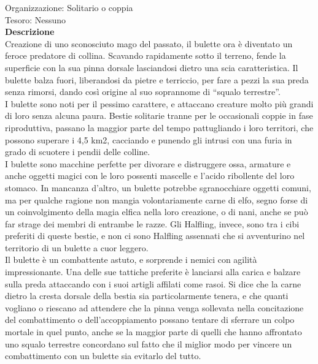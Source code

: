 \begin{multicols}{2}
Organizzazione: Solitario o coppia\\
Tesoro: Nessuno\\
\textbf{Descrizione}\\
Creazione di uno sconosciuto mago del passato, il bulette ora è diventato un feroce predatore di collina. Scavando rapidamente sotto il terreno, fende la superficie con la sua pinna dorsale lasciandosi dietro una scia caratteristica. Il bulette balza fuori, liberandosi da pietre e terriccio, per fare a pezzi la sua preda senza rimorsi, dando così origine al suo soprannome di “squalo terrestre”.\\
I bulette sono noti per il pessimo carattere, e attaccano creature molto più grandi di loro senza alcuna paura. Bestie solitarie tranne per le occasionali coppie in fase riproduttiva, passano la maggior parte del tempo pattugliando i loro territori, che possono superare i 4,5 km2, cacciando e punendo gli intrusi con una furia in grado di scuotere i pendii delle colline.\\
I bulette sono macchine perfette per divorare e distruggere ossa, armature e anche oggetti magici con le loro possenti mascelle e l'acido ribollente del loro stomaco. In mancanza d'altro, un bulette potrebbe sgranocchiare oggetti comuni, ma per qualche ragione non mangia volontariamente carne di elfo, segno forse di un coinvolgimento della magia elfica nella loro creazione, o di nani, anche se può far strage dei membri di entrambe le razze. Gli Halfling, invece, sono tra i cibi preferiti di queste bestie, e non ci sono Halfling assennati che si avventurino nel territorio di un bulette a cuor leggero.\\
Il bulette è un combattente astuto, e sorprende i nemici con agilità impressionante. Una delle sue tattiche preferite è lanciarsi alla carica e balzare sulla preda attaccando con i suoi artigli affilati come rasoi. Si dice che la carne dietro la cresta dorsale della bestia sia particolarmente tenera, e che quanti vogliano o riescano ad attendere che la pinna venga sollevata nella concitazione del combattimento o dell'accoppiamento possano tentare di sferrare un colpo mortale in quel punto, anche se la maggior parte di quelli che hanno affrontato uno squalo terrestre concordano sul fatto che il miglior modo per vincere un combattimento con un bulette sia evitarlo del tutto.\\


\end{multicols}
